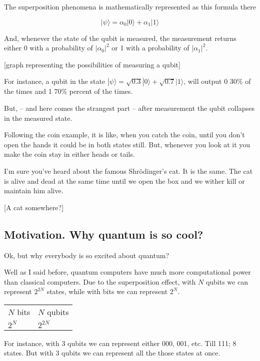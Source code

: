 \documentclass[11pt]{article}
\begin{document}
The superposition phenomena is mathematically represented as this formula there

$${\displaystyle |\psi \rangle =\alpha_0 |0\rangle +\alpha_1 |1\rangle }$$


And, whenever the state of the qubit is measured, the measurement returns either 0 with a probability of  \(|\alpha_0| ^2\) or 1 with a probability of \(|\alpha_1| ^2\).

[graph representing the possibilities of measuring a qubit]

For instance, a qubit in the state \(|\psi \rangle =\sqrt{0.3} |0\rangle + \sqrt{0.7} |1\rangle\), will output 0 30\% of the times and 1 70\% percent of the times.

But, -- and here comes the strangest part -- after measurement the qubit collapses in the measured state.

Following the coin example, it is like, when you catch the coin, until you don't open the hands it could be in both states still.
But, whenever you look at it you make the coin stay in either heads or tails.

I'm sure you've heard about the famous Shrödinger's cat.
It is the same. 
The cat is alive and dead at the same time until we open the box and we wither kill or maintain him alive.

[A cat somewhere?]

\subsection{Motivation. Why quantum is so cool?}
\label{sec:org4da5130}

Ok, but why everybody is so excited about quantum?

Well as I said before, quantum computers have much more computational power than classical computers.
Due to the superposition effect, with \(N\) qubits we can represent \(2^{2N}\) states, while with bits we can represent \(2^N\).

\begin{center}
\begin{tabular}{ll}
\(N\) bits & \(N\) qubits\\
\(2^N\) & \(2^{2N}\)\\
\end{tabular}
\end{center}

For instance, with 3 qubits we can represent either 000, 001, etc. Till 111; 8 states.
But with 3 qubits we can represent all the those states at once.
\end{document}
